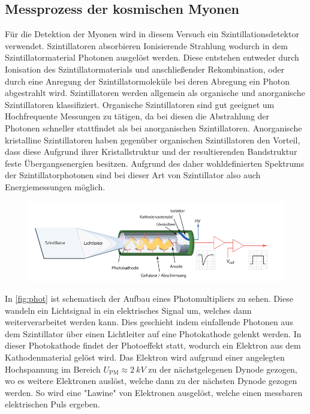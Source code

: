 \subsection{Messprozess der kosmischen Myonen}
Für die Detektion der Myonen wird in diesem Versuch ein Szintillationsdetektor verwendet. Szintillatoren absorbieren Ionisierende Strahlung wodurch in dem Szintillatormaterial Photonen ausgelöst werden. Diese entstehen entweder durch Ionisation des Szintillatormaterials und anschließender Rekombination, oder 
durch eine Anregung der Szintillatormoleküle bei deren Abregung ein Photon abgestrahlt wird. Szintillatoren werden allgemein als organische und anorganische Szintillatoren klassifiziert. Organische Szintillatoren sind gut geeignet um Hochfrequente Messungen zu tätigen, da bei diesen die Abstrahlung der Photonen schneller stattfindet als bei anorganischen Szintillatoren. Anorganische kristalline Szintillatoren haben gegenüber organischen Szintillatoren den Vorteil, dass diese Aufgrund ihrer Kristallstruktur und der resultierenden Bandstruktur feste Übergangsenergien besitzen. Aufgrund des daher wohldefinierten Spektrums der Szintillatorphotonen sind bei dieser Art von Szintillator also auch Energiemessungen möglich. 

\begin{figure}[H]
    \centering
    \includegraphics[width=0.8\linewidth]{data/photomult.png}
    \label{fig:phot}
\end{figure}
\noindent
In \autoref{fig:phot} ist schematisch der Aufbau eines Photomultipliers zu sehen. Diese wandeln ein Lichtsignal in ein elektrisches Signal um, welches dann weiterverarbeitet werden kann. Dies geschieht indem einfallende Photonen aus dem Szintillator über einen Lichtleiter auf eine Photokathode gelenkt werden. In dieser Photokathode findet der
Photoeffekt statt, wodurch ein Elektron aus dem Kathodenmaterial gelöst wird. Das Elektron wird aufgrund einer angelegten Hochspannung im Bereich $U_{\text{PM}} \approx \SI{2}{kV}$ zu der nächstgelegenen Dynode gezogen, wo es weitere Elektronen auslöst, welche dann zu der nächsten Dynode gezogen werden. So wird eine "Lawine" von Elektronen ausgelöst, welche einen messbaren elektrischen Puls ergeben.
\newpage

